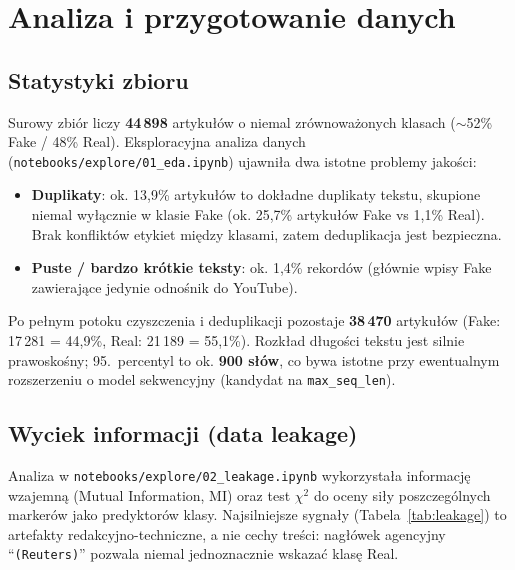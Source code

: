 \section{Analiza i przygotowanie danych}
\label{sec:dane}

\subsection{Statystyki zbioru}

Surowy zbiór liczy \textbf{44\,898} artykułów o niemal zrównoważonych klasach
($\sim$52\% Fake / 48\% Real). Eksploracyjna analiza danych
(\texttt{notebooks/explore/01\_eda.ipynb}) ujawniła dwa istotne problemy jakości:

\begin{itemize}[noitemsep]
  \item \textbf{Duplikaty}: ok. 13{,}9\% artykułów to dokładne duplikaty tekstu,
        skupione niemal wyłącznie w klasie Fake (ok. 25{,}7\% artykułów Fake vs
        1{,}1\% Real). Brak konfliktów etykiet między klasami, zatem deduplikacja jest bezpieczna.
  \item \textbf{Puste / bardzo krótkie teksty}: ok. 1{,}4\% rekordów (głównie wpisy
        Fake zawierające jedynie odnośnik do YouTube).
\end{itemize}

Po pełnym potoku czyszczenia i deduplikacji pozostaje \textbf{38\,470} artykułów
(Fake: 17\,281 = 44{,}9\%, Real: 21\,189 = 55{,}1\%). Rozkład długości tekstu jest
silnie prawoskośny; 95.~percentyl to ok. \textbf{900 słów}, co bywa istotne przy
ewentualnym rozszerzeniu o model sekwencyjny (kandydat na \texttt{max\_seq\_len}).

\subsection{Wyciek informacji (data leakage)}

Analiza w \texttt{notebooks/explore/02\_leakage.ipynb} wykorzystała informację
wzajemną (Mutual Information, MI) oraz test $\chi^2$ do oceny siły poszczególnych
markerów jako predyktorów klasy. Najsilniejsze sygnały (Tabela~\ref{tab:leakage})
to artefakty redakcyjno-techniczne, a nie cechy treści: nagłówek agencyjny
``\texttt{(Reuters)}'' pozwala niemal jednoznacznie wskazać klasę Real.

